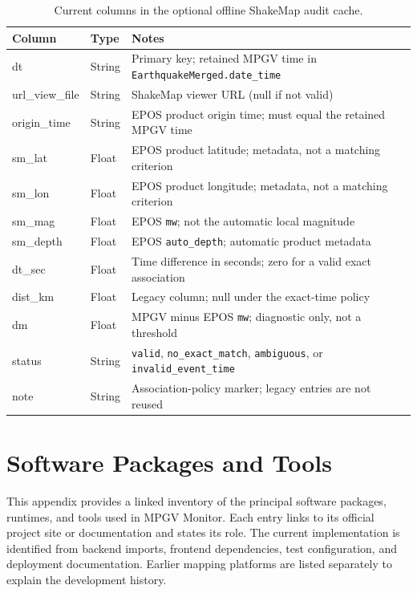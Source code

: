 \documentclass[12pt]{article}
\begin{document}
\begin{table}[H]
\centering
\caption{Current columns in the optional offline ShakeMap audit cache.}
\footnotesize
\setlength{\tabcolsep}{3pt}
\begin{tabular}{>{\raggedright\arraybackslash}p{3.1cm}>{\raggedright\arraybackslash}p{2.0cm}>{\raggedright\arraybackslash}p{8.6cm}}
\hline
\textbf{Column} & \textbf{Type} & \textbf{Notes} \\
\hline
dt              & String  & Primary key; retained MPGV time in \texttt{EarthquakeMerged.date\_time} \\
url\_view\_file & String  & ShakeMap viewer URL (null if not valid) \\
origin\_time    & String  & EPOS product origin time; must equal the retained MPGV time \\
sm\_lat         & Float   & EPOS product latitude; metadata, not a matching criterion \\
sm\_lon         & Float   & EPOS product longitude; metadata, not a matching criterion \\
sm\_mag         & Float   & EPOS \texttt{mw}; not the automatic local magnitude \\
sm\_depth       & Float   & EPOS \texttt{auto\_depth}; automatic product metadata \\
dt\_sec         & Float   & Time difference in seconds; zero for a valid exact association \\
dist\_km        & Float   & Legacy column; null under the exact-time policy \\
dm              & Float   & MPGV minus EPOS \texttt{mw}; diagnostic only, not a threshold \\
status          & String  & \texttt{valid}, \texttt{no\_exact\_match}, \texttt{ambiguous}, or \texttt{invalid\_event\_time} \\
note            & String  & Association-policy marker; legacy entries are not reused \\
\hline
\end{tabular}
\end{table}

\clearpage
\section{Software Packages and Tools}
\label{app:software-packages}

This appendix provides a linked inventory of the principal software packages, runtimes, and tools used in MPGV Monitor. Each entry links to its official project site or documentation and states its role. The current implementation is identified from backend imports, frontend dependencies, test configuration, and deployment documentation. Earlier mapping platforms are listed separately to explain the development history.
\end{document}
